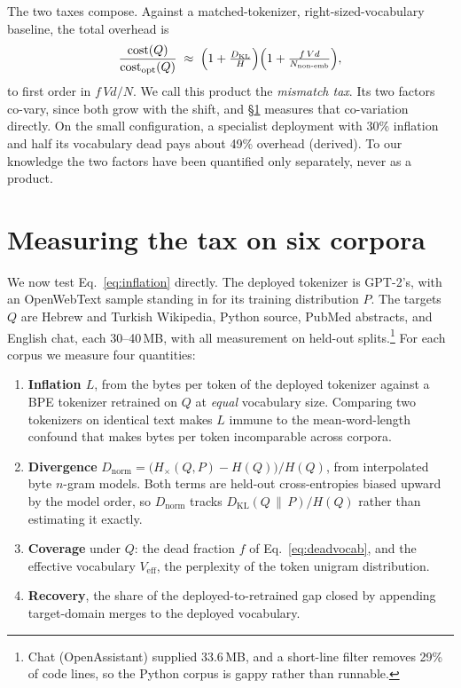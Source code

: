 \documentclass{article}
\begin{document}
The two taxes compose. Against a matched-tokenizer, right-sized-vocabulary baseline, the total overhead is
\[
\frac{\mathrm{cost}(Q)}{\mathrm{cost}_{\mathrm{opt}}(Q)} \;\approx\; \Bigl(1+\tfrac{D_{\mathrm{KL}}}{H}\Bigr)\Bigl(1+\tfrac{f\,Vd}{N_{\text{non-emb}}}\Bigr),
\]
to first order in $f\,Vd/N$. We call this product the \emph{mismatch tax}. Its two factors co-vary, since both grow with the shift, and \S\ref{sec:demo} measures that co-variation directly. On the small configuration, a specialist deployment with 30\% inflation and half its vocabulary dead pays about 49\% overhead (derived). To our knowledge the two factors have been quantified only separately, never as a product.

\section{Measuring the tax on six corpora}
\label{sec:demo}

We now test Eq.~\eqref{eq:inflation} directly. The deployed tokenizer is GPT-2's, with an OpenWebText sample standing in for its training distribution $P$. The targets $Q$ are Hebrew and Turkish Wikipedia, Python source, PubMed abstracts, and English chat, each 30--40\,MB, with all measurement on held-out splits.\footnote{Chat (OpenAssistant) supplied 33.6\,MB, and a short-line filter removes 29\% of code lines, so the Python corpus is gappy rather than runnable.} For each corpus we measure four quantities:

\begin{enumerate}[leftmargin=2em,itemsep=1pt,topsep=3pt]
\item \textbf{Inflation $L$}, from the bytes per token of the deployed tokenizer against a BPE tokenizer retrained on $Q$ at \emph{equal} vocabulary size. Comparing two tokenizers on identical text makes $L$ immune to the mean-word-length confound that makes bytes per token incomparable across corpora.
\item \textbf{Divergence} $D_{\mathrm{norm}} = \bigl(H_{\times}(Q,P) - H(Q)\bigr)/H(Q)$, from interpolated byte $n$-gram models. Both terms are held-out cross-entropies biased upward by the model order, so $D_{\mathrm{norm}}$ tracks $D_{\mathrm{KL}}(Q\,\|\,P)/H(Q)$ rather than estimating it exactly.
\item \textbf{Coverage} under $Q$: the dead fraction $f$ of Eq.~\eqref{eq:deadvocab}, and the effective vocabulary $V_{\mathrm{eff}}$, the perplexity of the token unigram distribution.
\item \textbf{Recovery}, the share of the deployed-to-retrained gap closed by appending target-domain merges to the deployed vocabulary.
\end{enumerate}
\end{document}
